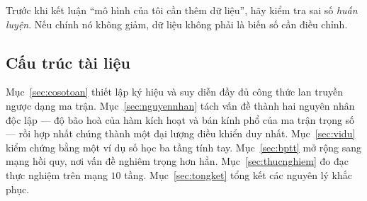 \begin{notebox}
Trước khi kết luận ``mô hình của tôi cần thêm dữ liệu'', hãy kiểm tra sai số
\emph{huấn luyện}. Nếu chính nó không giảm, dữ liệu không phải là biến số cần
điều chỉnh.
\end{notebox}

\subsection{Cấu trúc tài liệu}

Mục~\ref{sec:cosotoan} thiết lập ký hiệu và suy diễn đầy đủ công thức lan truyền
ngược dạng ma trận. Mục~\ref{sec:nguyennhan} tách vấn đề thành hai nguyên nhân độc
lập --- độ bão hoà của hàm kích hoạt và bán kính phổ của ma trận trọng số --- rồi
hợp nhất chúng thành một đại lượng điều khiển duy nhất. Mục~\ref{sec:vidu} kiểm
chứng bằng một ví dụ số học ba tầng tính tay. Mục~\ref{sec:bptt} mở rộng sang mạng
hồi quy, nơi vấn đề nghiêm trọng hơn hẳn. Mục~\ref{sec:thucnghiem} đo đạc thực
nghiệm trên mạng $10$ tầng. Mục~\ref{sec:tongket} tổng kết các nguyên lý khắc phục.
